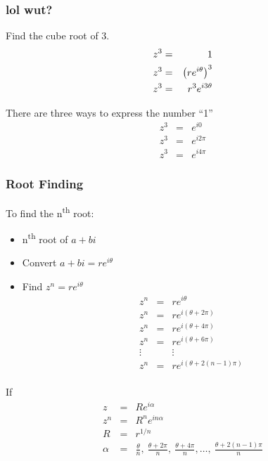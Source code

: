 \begin{frame}
  \frametitle{lol wut?}

  Find the cube root of 3.
  \begin{eqnarray*}
    z^3 & = & 1 \\
    z^3 & = & \left( r e^{i\theta} \right)^3 \\
    z^3 & = & r^3 e^{i3\theta}
  \end{eqnarray*}

  There are three ways to express the number ``1''
  \begin{eqnarray*}
    z^3 & = & e^{i0} \\
    z^3 & = & e^{i2\pi} \\
    z^3 & = & e^{i4\pi}
  \end{eqnarray*}
  
\end{frame}

\begin{frame}
  \frametitle{Root Finding}
  To find the n\textsuperscript{th} root:
  \begin{itemize}
  \item n\textsuperscript{th} root of $a+bi$
  \item Convert $a+bi=re^{i\theta}$
  \item Find $z^n=re^{i\theta}$
    \begin{eqnarray*}
      z^n & = & re^{i\theta} \\
      z^n & = & re^{i(\theta+2\pi)} \\
      z^n & = & re^{i(\theta+4\pi)} \\
      z^n & = & re^{i(\theta+6\pi)} \\
      \vdots & & \vdots \\
      z^n & = & re^{i(\theta+2(n-1)\pi)} \\
    \end{eqnarray*}
  \end{itemize}
\end{frame}

\begin{frame}
  If
  \begin{eqnarray*}
    z & = & R e^{i\alpha} \\
    z^n & = & R^n e^{i n\alpha} \\
    R & = & r^{1/n} \\
    \alpha & = & \frac{\theta}{n}, ~ \frac{\theta+2\pi}{n}, ~
    \frac{\theta+4\pi}{n}, \ldots, ~ \frac{\theta+2(n-1)\pi}{n}
  \end{eqnarray*}
\end{frame}

